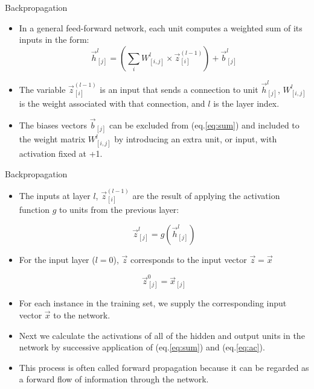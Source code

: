 \documentclass[handout]{beamer}
\begin{document}
\begin{frame}{Backpropagation}
\begin{scriptsize}


\begin{itemize}
\item In a general feed-forward network, each unit computes a weighted sum of its inputs in the form:
\begin{equation}
\vec{h}_{[j]}^l = \left(\sum_{i}  W_{[i,j]}^l \times \vec{z}_{[i]}^{(l-1)}\right) + \vec{b}_{[j]}^l 
\label{eq:sum}
\end{equation}

\item The variable $\vec{z}_{[i]}^{(l-1)}$ is an input that sends a connection to unit $\vec{h}_{[j]}^l$, $W_{[i,j]}^l$ is the weight associated with that connection, and $l$ is the layer index.

\item The biases vectors  $\vec{b}_{[j]}$ can be excluded from (eq.\ref{eq:sum}) and included to the weight matrix $W_{[i,j]}^l$ by introducing an extra unit, or input, with activation fixed at +1.

\end{itemize}


\end{scriptsize}
\end{frame}


\begin{frame}{Backpropagation}
\begin{scriptsize}


\begin{itemize}

\item The inputs at layer $l$, $\vec{z}_{[i]}^{(l-1)}$ are the result of applying the activation function $g$ to units from the previous layer:

\begin{equation}
\vec{z}_{[j]}^{l} = g(\vec{h}_{[j]}^{l})
\label{eq:ac}
\end{equation}

\item For the input layer ($l=0$), $\vec{z}$ corresponds to the input vector $\vec{z} = \vec{x}$ 

\begin{equation}
\vec{z}_{[j]}^0 = \vec{x}_{[j]}
\end{equation}

\item For each instance in the training set, we supply the corresponding input vector $\vec{x}$ to the network.
\item Next we calculate the activations of all of the hidden and output units in the network by successive application of (eq.\ref{eq:sum}) and (eq.\ref{eq:ac}). 

\item This process is often called forward propagation because it can be regarded
as a forward flow of information through the network.

\end{itemize}


\end{scriptsize}
\end{frame}
\end{document}
